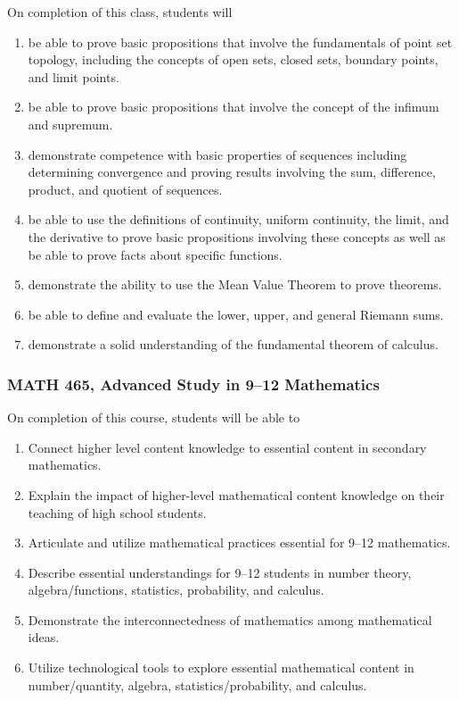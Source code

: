 \documentclass[11pt]{article}
\newenvironment{alphalist}{
\begin{enumerate}[label=(\arabic*),widest=107 ,leftmargin=25pt, itemsep=0pt]}
{\end{enumerate}}
\begin{document}
On completion of this class, students will
\begin{alphalist}
    \item be able to prove basic propositions that involve the fundamentals of point set topology, including the concepts of open sets, closed sets, boundary points, and limit points.
     \item be able to prove basic propositions that involve the concept of the infimum and supremum. 
    \item demonstrate competence with basic properties of sequences including determining convergence and proving results involving the sum, difference, product, and quotient of sequences.
    \item be able to use the definitions of continuity, uniform continuity, the limit, and the derivative to prove basic propositions involving these concepts as well as be able to prove facts about specific functions.
    \item demonstrate the ability to use the Mean Value Theorem to prove theorems. 
    \item be able to define and evaluate the lower, upper, and general Riemann sums.
    \item demonstrate a solid understanding of the fundamental theorem of calculus.
\end{alphalist}

\subsubsection*{MATH 465, Advanced Study in 9--12 Mathematics}

On  completion of this course, students will be able to
\begin{alphalist}

\item Connect higher level content knowledge to essential content in secondary mathematics.
\item Explain the impact of higher-level mathematical content knowledge on their teaching of high school students.
\item Articulate and utilize mathematical practices essential for 9--12 mathematics.
\item Describe essential understandings for 9--12 students in number theory, algebra/functions, statistics, probability, and calculus.
\item Demonstrate the interconnectedness of mathematics among mathematical ideas.
\item Utilize technological tools to explore essential mathematical content in number/quantity, algebra, statistics/probability, and calculus.
\end{alphalist}
\end{document}
